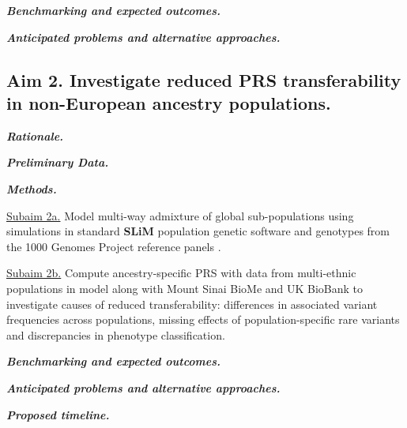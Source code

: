 \documentclass[11pt]{article}  %
\newlength\tindent
\renewcommand{\indent}{\hspace*{\tindent}}
\begin{document}
\indent \textbf{\textit{Benchmarking and expected outcomes.}}


\indent \textbf{\textit{Anticipated problems and alternative approaches.}}

\subsection*{Aim 2. Investigate reduced PRS transferability in non-European ancestry populations.}

\indent \textbf{\textit{Rationale.}}

\indent \textbf{\textit{Preliminary Data.}}

\indent \textbf{\textit{Methods.}}






\indent \underline{Subaim 2a.} Model multi-way admixture of global sub-populations using simulations in standard \textbf{SLiM} population genetic software \cite{haller_slim_2019} and genotypes from the 1000 Genomes Project reference panels \cite{noauthor_global_2015}.

\indent \underline{Subaim 2b.} Compute ancestry-specific PRS with data from multi-ethnic populations in model along with Mount Sinai BioMe and UK BioBank to investigate causes of reduced transferability: differences in associated variant frequencies across populations, missing effects of population-specific rare variants and discrepancies in phenotype classification. 

\indent \textbf{\textit{Benchmarking and expected outcomes.}}


\indent \textbf{\textit{Anticipated problems and alternative approaches.}}


\textbf{\textit{Proposed timeline.}}






\newpage

\end{document}
